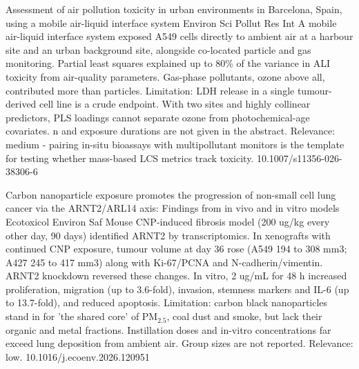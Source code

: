 \documentclass[10pt]{article}
\begin{document}
{Assessment of air pollution toxicity in urban environments in Barcelona, Spain, using a mobile air-liquid interface system}
{Environ Sci Pollut Res Int}
{A mobile air-liquid interface system exposed A549 cells directly to ambient air at a harbour site and an urban background site, alongside co-located particle and gas monitoring. Partial least squares explained up to 80\% of the variance in ALI toxicity from air-quality parameters. Gas-phase pollutants, ozone above all, contributed more than particles. Limitation: LDH release in a single tumour-derived cell line is a crude endpoint. With two sites and highly collinear predictors, PLS loadings cannot separate ozone from photochemical-age covariates. n and exposure durations are not given in the abstract. Relevance: medium - pairing in-situ bioassays with multipollutant monitors is the template for testing whether mass-based LCS metrics track toxicity.}
{10.1007/s11356-026-38306-6}

{Carbon nanoparticle exposure promotes the progression of non-small cell lung cancer via the ARNT2/ARL14 axis: Findings from in vivo and in vitro models}
{Ecotoxicol Environ Saf}
{Mouse CNP-induced fibrosis model (200 ug/kg every other day, 90 days) identified ARNT2 by transcriptomics. In xenografts with continued CNP exposure, tumour volume at day 36 rose (A549 194 to 308 mm3; A427 245 to 417 mm3) along with Ki-67/PCNA and N-cadherin/vimentin. ARNT2 knockdown reversed these changes. In vitro, 2 ug/mL for 48 h increased proliferation, migration (up to 3.6-fold), invasion, stemness markers and IL-6 (up to 13.7-fold), and reduced apoptosis. Limitation: carbon black nanoparticles stand in for 'the shared core' of PM$_{2.5}$, coal dust and smoke, but lack their organic and metal fractions. Instillation doses and in-vitro concentrations far exceed lung deposition from ambient air. Group sizes are not reported. Relevance: low.}
{10.1016/j.ecoenv.2026.120951}

\par{}\baselineskip{}\baselineskip
{}
\end{document}
